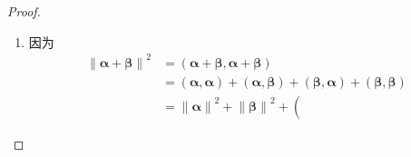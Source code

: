 {\begin{proof}
\begin{enumerate}[label=\arabic*)]
\begin{align*}
                                                                        & =\left(
                      \bm{\beta},\bm{\beta}
                      \right)-\frac{
                          \left(
                          \bm{\beta},\bm{\alpha}
                          \right)
                      }{
                          \left\lVert \bm{\alpha}\right\rVert ^2
                      }\left(
                      \bm{\alpha},\bm{\beta}
                      \right)                                                                                           \\
                                                                        & =\left\lVert \bm{\beta}\right\rVert ^2-\frac{
                          \left| \left(
                          \bm{\beta},\bm{\alpha}
                          \right)\right|^2
                      }{
                          \left\lVert \bm{\alpha}\right\rVert ^2
                      }
                  \end{align*}即\[
                      \left|\left(
                      \bm{\alpha},\bm{\beta}
                      \right)\right|\leqslant \left\lVert \bm{\alpha}\right\rVert \left\lVert \bm{\beta}\right\rVert\]且等号成立当且仅当$\bm{\gamma}=\bm{0}$即$\bm{\beta}$与$\bm{\alpha}$线性相关.
            \item 因为\begin{align*}
                      \left\lVert \bm{\alpha}+\bm{\beta}\right\rVert ^2 & =\left(
                      \bm{\alpha}+\bm{\beta},\bm{\alpha}+\bm{\beta}
                      \right)                                                                                                                                                                                                             \\
                                                                        & =\left(
                      \bm{\alpha},\bm{\alpha}
                      \right)+\left(
                      \bm{\alpha},\bm{\beta}
                      \right)+\left(
                      \bm{\beta},\bm{\alpha}
                      \right)+\left(
                      \bm{\beta},\bm{\beta}
                      \right)                                                                                                                                                                                                             \\
                                                                        & =\left\lVert \bm{\alpha}\right\rVert ^2+\left\lVert \bm{\beta}\right\rVert ^2+\left(

\end{align*}
\end{enumerate}
\end{proof}}
